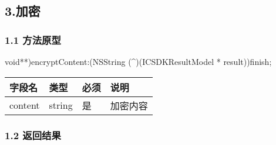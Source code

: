 \documentclass[letterpaper,10pt,english]{sphinxmanual}
\begin{document}

\begin{sphinxVerbatim}[commandchars=\\\{\}]
     
\end{sphinxVerbatim}


\subsection{3.加密}
\label{\detokenize{BCBWalletSDK_u63a5_u53e3_u8bf4_u660e:id92}}

\subsubsection{1.1 方法原型}
\label{\detokenize{BCBWalletSDK_u63a5_u53e3_u8bf4_u660e:id93}}
\sphinxstylestrong{-(}void**)encryptContent:(NSString (\textasciicircum{})(ICSDKResultModel * result))finish;



\begin{savenotes}\sphinxattablestart
\centering
\begin{tabulary}{\linewidth}[t]{|T|T|T|T|}
\hline
\sphinxstyletheadfamily 
字段名
&\sphinxstyletheadfamily 
类型
&\sphinxstyletheadfamily 
必须
&\sphinxstyletheadfamily 
说明
\\
\hline
content
&
string
&
是
&
加密内容
\\
\hline
\end{tabulary}
\par
\sphinxattableend\end{savenotes}


\subsubsection{1.2 返回结果}
\label{\detokenize{BCBWalletSDK_u63a5_u53e3_u8bf4_u660e:id94}}

\begin{sphinxVerbatim}[commandchars=\\\{\}]
     
     
\end{sphinxVerbatim}
\end{document}
